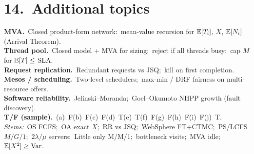 \section*{14.\ Additional topics}
\textbf{MVA.}\ Closed product-form network:\ mean-value recursion for $\mathbb{E}[T_i]$, $X$, $\mathbb{E}[N_i]$ (Arrival Theorem).\\
\textbf{Thread pool.}\ Closed model + MVA for sizing;\ reject if all threads busy;\ cap $M$ for $\mathbb{E}[T]\le$ SLA.\\
\textbf{Request replication.}\ Redundant requests vs JSQ;\ kill on first completion.\\
\textbf{Mesos / scheduling.}\ Two-level schedulers;\ max-min / DRF fairness on multi-resource offers.\\
\textbf{Software reliability.}\ Jelinski--Moranda;\ Goel--Okumoto NHPP growth (fault discovery).\\
\textbf{T/F (sample).}\ (a)~F\quad (b)~F\quad (c)~F\quad (d)~T\quad (e)~T\quad (f)~F\quad (g)~F\quad (h)~F\quad (i)~F\quad (j)~T.\\
\textit{Stems:}\ OS FCFS;\ OA exact $X$;\ RR vs JSQ;\ WebSphere FT+CTMC;\ PS/LCFS $M/G/1$;\ $2\lambda/\mu$ servers;\ Little only M/M/1;\ bottleneck visits;\ MVA idle;\ $\mathbb{E}[X^2]\ge\mathrm{Var}$.
